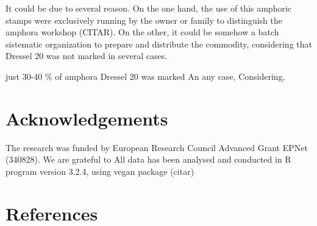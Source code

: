 \documentclass[review]{elsarticle}
\begin{document}
It could be due to several reason. On the one hand, the use of this amphoric stamps were exclusively running by the owner or family to distinguish the amphora workshop (CITAR). On the other, it could be somehow a batch sistematic organization to prepare and distribute the commodity, considering that Dressel 20 was not marked in several cases. 


just 30-40 \% of amphora Dressel 20 was marked 
An any case, 
Considering, 

\section{Acknowledgements}

The research was funded by European Research Council Advanced Grant EPNet (340828). We are grateful to 
All data has been analysed and conducted in R program version 3.2.4, using vegan package (citar) 


\section{References}


\end{document}
